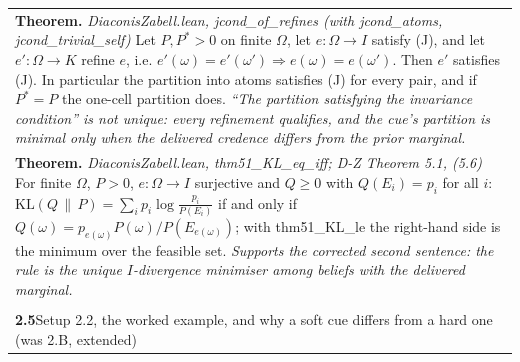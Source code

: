 \documentclass[10pt]{article}
\theoremstyle{definition}
\newlength{\fullw}\setlength{\fullw}{25.9cm}
\newcommand{\entryhead}[2]{\multicolumn{3}{|l|}{\rule{0pt}{2.6ex}\large\textbf{#1}\quad #2} \\ \hline}
\begin{document}
{\begin{longtable}{|p{0.9cm}|p{12.2cm}|p{12.2cm}|}
\multicolumn{3}{|p{\fullw}|}{\textbf{Theorem.} \textit{DiaconisZabell.lean, jcond\_of\_refines (with jcond\_atoms, jcond\_trivial\_self)} \newline Let $P,P^*>0$ on finite $\Omega$, let $e:\Omega\to I$ satisfy (J), and let
$e':\Omega\to K$ refine $e$, i.e. $e'(\omega)=e'(\omega')\Rightarrow e(\omega)=e(\omega')$.
Then $e'$ satisfies (J). In particular the partition into atoms satisfies (J) for every pair,
and if $P^*=P$ the one-cell partition does. \newline \textit{``The partition satisfying the invariance condition'' is not unique: every refinement qualifies, and the cue's partition is minimal only when the delivered credence differs from the prior marginal.}} \\
\multicolumn{3}{|p{\fullw}|}{\textbf{Theorem.} \textit{DiaconisZabell.lean, thm51\_KL\_eq\_iff; D-Z Theorem 5.1, (5.6)} \newline For finite $\Omega$, $P>0$, $e:\Omega\to I$ surjective and $Q\ge0$ with
$Q(E_i)=p_i$ for all $i$: $\mathrm{KL}(Q\,\|\,P)=\sum_i p_i\log\frac{p_i}{P(E_i)}$ if and
only if $Q(\omega)=p_{e(\omega)}P(\omega)/P(E_{e(\omega)})$; with thm51\_KL\_le the
right-hand side is the minimum over the feasible set. \newline \textit{Supports the corrected second sentence: the rule is the unique $I$-divergence minimiser among beliefs with the delivered marginal.}} \\ \hline
\multicolumn{3}{|l|}{} \\ \hline
\entryhead{2.5}{Setup 2.2, the worked example, and why a soft cue differs from a hard one (was 2.B, extended)\quad{\footnotesize\textit{(formerly E.3)}}}

\end{longtable}}
\end{document}
